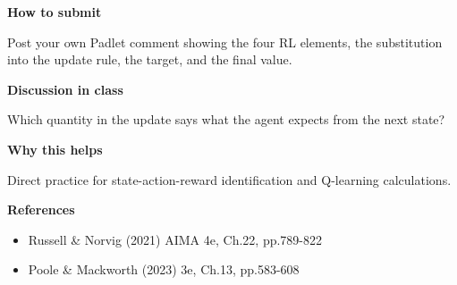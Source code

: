 \documentclass[11pt]{article}
\begin{document}
\begin{tcolorbox}[colback=white,colframe=MidnightBlue,title={Q3 Structured Problem},fonttitle=\bfseries,breakable]
{\large\bfseries\color{MidnightBlue} How to submit}\par\medskip
Post your own Padlet comment showing the four RL elements, the substitution into the update rule, the target, and the final value.

{\large\bfseries\color{MidnightBlue} Discussion in class}\par\medskip
Which quantity in the update says what the agent expects from the next state?

{\large\bfseries\color{MidnightBlue} Why this helps}\par\medskip
Direct practice for state-action-reward identification and Q-learning calculations.

{\large\bfseries\color{MidnightBlue} References}\par\medskip
\begin{itemize}\item Russell \& Norvig (2021) AIMA 4e, Ch.22, pp.789-822
\item Poole \& Mackworth (2023) 3e, Ch.13, pp.583-608\end{itemize}
\end{tcolorbox}
\end{document}

